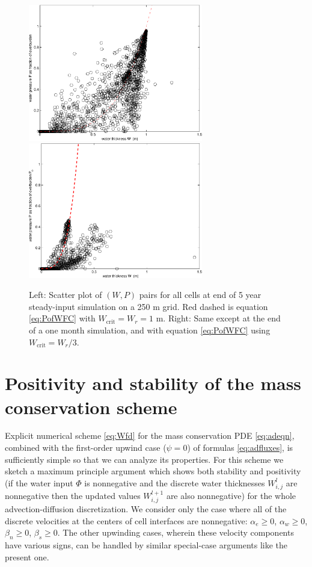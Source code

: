 \documentclass[11pt,final]{amsart}%
\newcommand{\Wlij}{W^l_{i,j}}
\begin{document}
\begin{figure}[ht]
\includegraphics[width=3.0in,keepaspectratio=true]{figs/isPofW-250m} \,
\includegraphics[width=3.0in,keepaspectratio=true]{figs/isPofW-250m-month}
\caption{Left: Scatter plot of $(W,P)$ pairs for all cells at end of 5 year steady-input simulation on a 250 m grid.  Red dashed is equation \eqref{eq:PofWFC} with $W_{\text{crit}} = W_r = 1$ m.  Right: Same except at the end of a one month simulation, and with equation \eqref{eq:PofWFC} using $W_{\text{crit}} = W_r / 3$.}
\label{fig:isPofWnbreen}
\end{figure}


\clearpage\newpage

\small

\normalsize


\clearpage\newpage
\appendix

\section{Positivity and stability of the mass conservation scheme}

Explicit numerical scheme \eqref{eq:Wfd} for the mass conservation PDE \eqref{eq:adeqn}, combined with the first-order upwind case ($\psi=0$) of formulas \eqref{eq:adfluxes}, is sufficiently simple so that we can analyze its properties.  For this scheme we sketch a maximum principle argument \citep{MortonMayers} which shows both stability and positivity (if the water input $\Phi$ is nonnegative and the discrete water thicknesses $\Wlij$ are nonnegative then the updated values $W_{i,j}^{l+1}$ are also nonnegative) for the whole advection-diffusion discretization.    We consider only the case where all of the discrete velocities at the centers of cell interfaces are nonnegative: $\alpha_e\ge 0$, $\alpha_w\ge 0$, $\beta_n\ge 0$, $\beta_s\ge 0$.  The other upwinding cases, wherein these velocity components have various signs, can be handled by similar special-case arguments like the present one.
\end{document}
